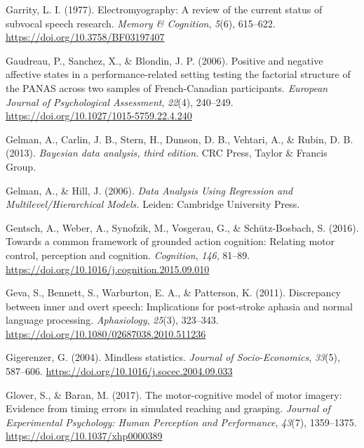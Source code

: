 \documentclass[a4paper,12pt,twoside,openright,oldfontcommands]{memoir}
\begin{document}
\leavevmode\hypertarget{ref-garrity_electromyography:_1977}{}%
Garrity, L. I. (1977). Electromyography: A review of the current status of subvocal speech research. \emph{Memory \& Cognition}, \emph{5}(6), 615--622. \url{https://doi.org/10.3758/BF03197407}

\leavevmode\hypertarget{ref-Gaudreau2006}{}%
Gaudreau, P., Sanchez, X., \& Blondin, J. P. (2006). Positive and negative affective states in a performance-related setting testing the factorial structure of the PANAS across two samples of French-Canadian participants. \emph{European Journal of Psychological Assessment}, \emph{22}(4), 240--249. \url{https://doi.org/10.1027/1015-5759.22.4.240}

\leavevmode\hypertarget{ref-gelman_bayesian_2013}{}%
Gelman, A., Carlin, J. B., Stern, H., Dunson, D. B., Vehtari, A., \& Rubin, D. B. (2013). \emph{Bayesian data analysis, third edition}. CRC Press, Taylor \& Francis Group.

\leavevmode\hypertarget{ref-gelman_data_2006}{}%
Gelman, A., \& Hill, J. (2006). \emph{Data Analysis Using Regression and Multilevel/Hierarchical Models.} Leiden: Cambridge University Press.

\leavevmode\hypertarget{ref-gentsch_towards_2016}{}%
Gentsch, A., Weber, A., Synofzik, M., Vosgerau, G., \& Schütz-Bosbach, S. (2016). Towards a common framework of grounded action cognition: Relating motor control, perception and cognition. \emph{Cognition}, \emph{146}, 81--89. \url{https://doi.org/10.1016/j.cognition.2015.09.010}

\leavevmode\hypertarget{ref-geva_discrepancy_2011}{}%
Geva, S., Bennett, S., Warburton, E. A., \& Patterson, K. (2011). Discrepancy between inner and overt speech: Implications for post-stroke aphasia and normal language processing. \emph{Aphasiology}, \emph{25}(3), 323--343. \url{https://doi.org/10.1080/02687038.2010.511236}

\leavevmode\hypertarget{ref-Gigerenzer2004}{}%
Gigerenzer, G. (2004). Mindless statistics. \emph{Journal of Socio-Economics}, \emph{33}(5), 587--606. \url{https://doi.org/10.1016/j.socec.2004.09.033}

\leavevmode\hypertarget{ref-glover_motor-cognitive_2017}{}%
Glover, S., \& Baran, M. (2017). The motor-cognitive model of motor imagery: Evidence from timing errors in simulated reaching and grasping. \emph{Journal of Experimental Psychology: Human Perception and Performance}, \emph{43}(7), 1359--1375. \url{https://doi.org/10.1037/xhp0000389}
\end{document}
